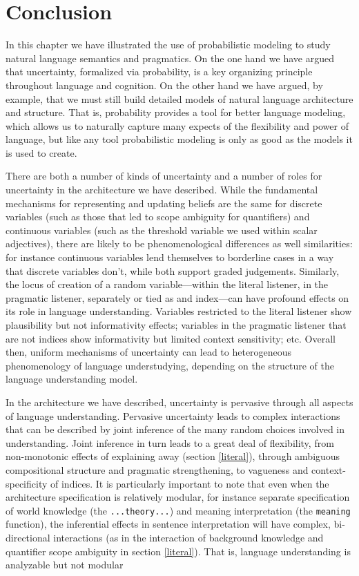 \documentclass[pdfextras]{handbook}
\begin{document}
\section{Conclusion}

In this chapter we have illustrated the use of probabilistic modeling to study natural language semantics and pragmatics. On the one hand we have argued that uncertainty, formalized via probability, is a key organizing principle throughout language and cognition. On the other hand we have argued, by example, that we must still build detailed models of natural language architecture and structure. That is, probability provides a tool for better language modeling, which allows us to naturally capture many expects of the flexibility and power of language, but like any tool probabilistic modeling is only as good as the models it is used to create.

There are both a number of kinds of uncertainty and a number of roles for uncertainty in the architecture we have described.
While the fundamental mechanisms for representing and updating beliefs are the same for discrete variables (such as those that led to scope ambiguity for quantifiers) and continuous variables (such as the threshold variable we used within scalar adjectives), there are likely to be phenomenological differences as well similarities: for instance continuous variables lend themselves to borderline cases in a way that discrete variables don't, while both support graded judgements. Similarly, the locus of creation of a random variable---within the literal listener, in the pragmatic listener, separately or tied as and index---can have profound effects on its role in language understanding. Variables restricted to the literal listener show plausibility but not informativity effects; variables in the pragmatic listener that are not indices show informativity but limited context sensitivity; etc. Overall then, uniform mechanisms of uncertainty can lead to heterogeneous phenomenology of language understudying, depending on the structure of the language understanding model. 

In the architecture we have described, uncertainty is pervasive through all aspects of language understanding. Pervasive uncertainty leads to complex interactions that can be described by joint inference of the many random choices involved in understanding. Joint inference in turn leads to a great deal of flexibility, from non-monotonic effects of explaining away (section \ref{literal}), through ambiguous compositional structure and pragmatic strengthening, to vagueness and context-specificity of indices. It is particularly important to note that even when the architecture specification is relatively modular, for instance separate specification of world knowledge (the \lstinline{...theory...}) and meaning interpretation (the \lstinline{meaning} function), the inferential effects in sentence interpretation will have complex, bi-directional interactions (as in the interaction of background knowledge and quantifier scope ambiguity in section \ref{literal}). That is, language understanding is analyzable but not modular
\end{document}
